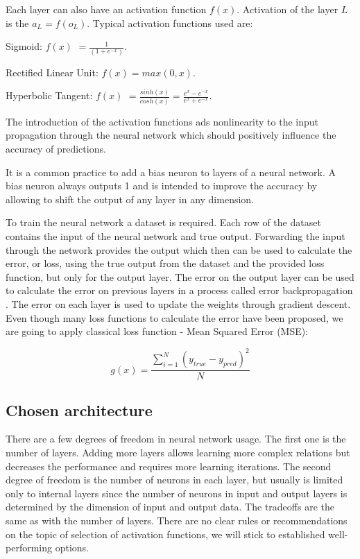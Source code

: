 Each layer can also have an activation function $ f(x) $. Activation of the layer $ L $ is the $ a_L = f(o_L) $. Typical activation functions used are:

\vspace{4pt}
Sigmoid: $ f(x) $ \Large $ = \frac{1}{(1 + e^{-x})} $.
\normalsize

\vspace{4pt}
Rectified Linear Unit: $ f(x) = max(0, x) $.

Hyperbolic Tangent: $ f(x) $ \Large $ = \frac{sinh(x)}{cosh(x)} = \frac{e^x - e^{-x}}{e^x + e^{-x}}$.
\normalsize
\vspace{4pt}

The introduction of the activation functions ads nonlinearity to the input propagation through the neural network which should positively influence the accuracy of predictions.

It is a common practice to add a bias neuron to layers of a neural network. A bias neuron always outputs 1 and is intended to improve the accuracy by allowing to shift the output of any layer in any dimension.

To train the neural network a dataset is required. Each row of the dataset contains the input of the neural network and true output. Forwarding the input through the network provides the output which then can be used to calculate the error, or loss, using the true output from the dataset and the provided loss function, but only for the output layer. The error on the output layer can be used to calculate the error on previous layers in a process called error backpropagation \cite{13}. The error on each layer is used to update the weights through gradient descent. Even though many loss functions to calculate the error have been proposed, we are going to apply classical loss function - Mean Squared Error (MSE):

$$ g(x) = \frac{\sum_{i=1}^{N} (y_{true} - y_{pred})^2}{N} $$

\subsection{Chosen architecture} \label{chosen_architecture}

There are a few degrees of freedom in neural network usage. The first one is the number of layers. Adding more layers allows learning more complex relations but decreases the performance and requires more learning iterations. The second degree of freedom is the number of neurons in each layer, but usually is limited only to internal layers since the number of neurons in input and output layers is determined by the dimension of input and output data. The tradeoffs are the same as with the number of layers. There are no clear rules or recommendations on the topic of selection of activation functions, we will stick to established well-performing options.

